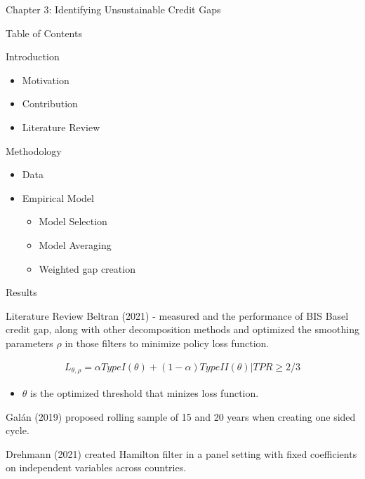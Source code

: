 \documentclass[
  ignorenonframetext,
]{beamer}
\providecommand{\tightlist}{%
  \setlength{\itemsep}{0pt}\setlength{\parskip}{0pt}}
\begin{document}
\begin{frame}{Chapter 3: Identifying Unsustainable Credit Gaps}
\protect\hypertarget{chapter-3-identifying-unsustainable-credit-gaps}{}
\begin{block}{Table of Contents}
\protect\hypertarget{table-of-contents-1}{}
\begin{block}{Introduction}
\protect\hypertarget{introduction-1}{}
\begin{itemize}
\tightlist
\item
  Motivation
\item
  Contribution
\item
  Literature Review
\end{itemize}
\end{block}

\begin{block}{Methodology}
\protect\hypertarget{methodology-1}{}
\begin{itemize}
\tightlist
\item
  Data
\item
  Empirical Model

  \begin{itemize}
  \tightlist
  \item
    Model Selection
  \item
    Model Averaging
  \item
    Weighted gap creation
  \end{itemize}
\end{itemize}
\end{block}

\begin{block}{Results}
\protect\hypertarget{results}{}
\end{block}
\end{block}
\end{frame}

\begin{frame}{Literature Review}
\protect\hypertarget{literature-review}{}
Beltran (2021) - measured and the performance of BIS Basel credit gap,
along with other decomposition methods and optimized the smoothing
parameters \(\rho\) in those filters to minimize policy loss function.

\begin{align*}
L_{\theta,\rho}=\alpha TypeI(\theta)+(1-\alpha)TypeII(\theta)|TPR\ge2/3
\end{align*}

\begin{itemize}
\tightlist
\item
  \(\theta\) is the optimized threshold that minizes loss function.
\end{itemize}

Galán (2019) proposed rolling sample of 15 and 20 years when creating
one sided cycle.

Drehmann (2021) created Hamilton filter in a panel setting with fixed
coefficients on independent variables across countries.
\end{frame}
\end{document}

